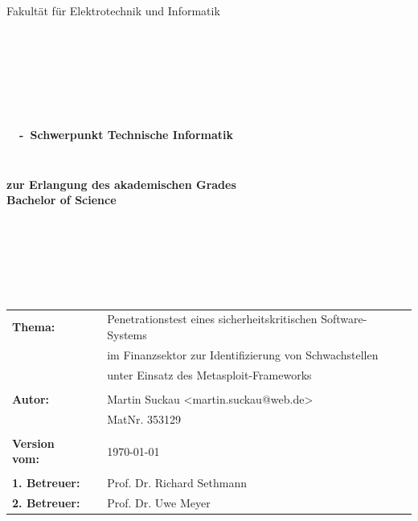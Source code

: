 \begin{center}
\Large{Fakultät für Elektrotechnik und Informatik}
\end{center}
\begin{verbatim}




\end{verbatim}
\begin{center}
\doublespacing
\textbf{\LARGE{\titleDocument}}\\
\singlespacing
\begin{verbatim}

\end{verbatim}
\textbf{{~\subjectDocument~-~Schwerpunkt Technische Informatik}}
\end{center}
\begin{verbatim}

\end{verbatim}
\begin{center}

\end{center}
\begin{verbatim}

\end{verbatim}
\begin{center}
\textbf{zur Erlangung des akademischen Grades \\ Bachelor of Science}
\end{center}
\begin{verbatim}






\end{verbatim}
\begin{flushleft}
\begin{tabular}{llll}
\textbf{Thema:} & & Penetrationstest eines sicherheitskritischen Software-Systems  & \\
& & im Finanzsektor zur Identifizierung von Schwachstellen & \\
&& unter Einsatz des Metasploit-Frameworks & \\
& & \\
\textbf{Autor:} & & Martin Suckau <martin.suckau@web.de> & \\
& & MatNr. 353129 & \\
& & \\
\textbf{Version vom:} & & \today &\\
& & \\
\textbf{1. Betreuer:} & & Prof. Dr. Richard Sethmann &\\
\textbf{2. Betreuer:} & & Prof. Dr. Uwe Meyer &\\
\end{tabular}
\end{flushleft}